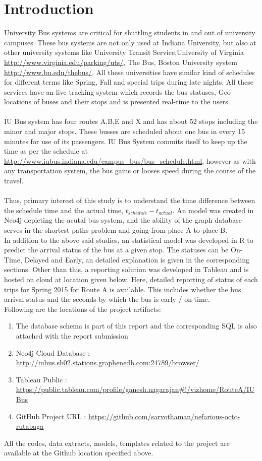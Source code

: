 \documentclass[12pt]{article}
\begin{document}
\section{Introduction}
University Bus systems are critical for shuttling students in and out of university campuses. These bus systems are not only used at Indiana University, but also at other university systems like University Transit Service,University of Virginia \url{http://www.virginia.edu/parking/uts/}, The Bus, Boston University system \url{http://www.bu.edu/thebus/}. All these universities have similar kind of schedules for different terms like Spring, Fall and special trips during late nights. All these services have an live tracking system which records the bus statuses, Geo-locations of buses and their stops and is presented real-time to the users.\\ \\
IU Bus system has four routes A,B,E and X and has about 52 stops including the minor and major stops. These busses are scheduled about one bus in every 15 minutes for use of its passengers. IU Bus System commits itself to keep up the time as per the schedule at \url{http://www.iubus.indiana.edu/campus_bus/bus_schedule.html}, however as with any transportation system, the bus gains or looses speed during the course of the travel. \\ \\
Thus, primary interest of this study is to understand the time difference between the schedule time and the actual time, $t_{schedule} - t_{actual}$. An model was created in Neo4j depicting the acutal bus system, and the ability of the graph database serves in the shortest paths problem and going from place A to place B. \\
In addition to the above said studies, an statistical model was developed in R to predict the arrival status of the bus at a given stop. The statuses can be On-Time, Delayed and Early, an detailed explanation is given in the corresponding sections. Other than this, a reporting solution was developed in Tableau and is hosted on cloud at location given below. Here, detailed reporting of status of each trips for Spring 2015 for Route A is available. This includes whether the bus arrival status and the seconds by which the bus is early / on-time. \\

Following are the locations of the project artifacts:
\begin{enumerate}
\item The database schema is part of this report and the corresponding SQL is also attached with the report submission
\item Neo4j Cloud Database : \url{http://iubus.sb02.stations.graphenedb.com:24789/browser/}
\item Tableau Public : \url{https://public.tableau.com/profile/ganesh.nagarajan#!/vizhome/RouteA/IUBus}
\item GitHub Project URL : \url{https://github.com/sarvothaman/nefarious-octo-rutabaga}
\end{enumerate}
All the codes, data extracts, models, templates related to the project are available at the Github location specified above.
\end{document}

